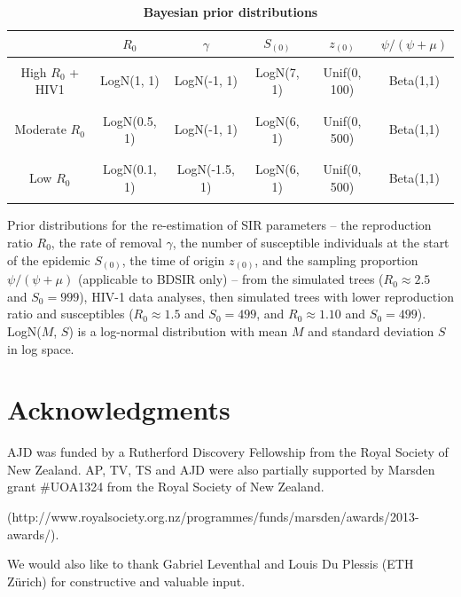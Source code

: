 \documentclass[12pt,titlepage]{article}
\newcommand{\BDSIR}{BDSIR}
\begin{document}
\begin{table}[!ht]
\begin{center}
\caption{
\bf{Bayesian prior distributions}}
\label{table:priors}
\begin{tabular}{|c|c|c|c|c|c|}
\hline
& $R_0$ & $\gamma$ & $S_{(0)}$ & $z_{(0)}$ & $\psi/(\psi+\mu)$ \\
  \hline
   & & & & & \\
High $R_{0}$ + HIV1 & LogN(1, 1) & LogN(-1, 1) & LogN(7, 1) & Unif(0, 100) & Beta(1,1) \\
   & & & & & \\
   \hline
   & & & & & \\
Moderate $R_0$ & LogN(0.5, 1) & LogN(-1, 1) & LogN(6, 1) & Unif(0, 500) & Beta(1,1) \\
   & & & & & \\
   \hline
      & & & & & \\
Low $R_0$ & LogN(0.1, 1) & LogN(-1.5, 1) & LogN(6, 1) & Unif(0, 500) & Beta(1,1) \\
   & & & & & \\
   \hline
\end{tabular}
\end{center}
{Prior distributions for the re-estimation of SIR parameters -- the reproduction ratio 
$R_0$, the rate of removal $\gamma$, the number of susceptible individuals at the start of 
the epidemic $S_{(0)}$, the time of origin $z_{(0)}$, and the sampling proportion $\psi/(\psi+\mu)$ (applicable to \BDSIR{} only) -- from the simulated trees (${R_0}\approx2.5$ and ${S_0}=999$), 
HIV-1 data analyses, then simulated trees with lower reproduction ratio and susceptibles (${R_0}\approx1.5$ and ${S_0}=499$, 
and $R_{0}\approx1.10$ and $S_{0}=499$). 
LogN($M$, $S$) is a log-normal distribution with mean $M$ and 
standard deviation $S$ in log space.}
\end{table}
%
\section{Acknowledgments}
AJD was funded by a Rutherford Discovery Fellowship from the Royal Society of New Zealand. 
AP, TV, TS and AJD were also partially supported by Marsden grant \#UOA1324 from the Royal Society of New Zealand.

(http://www.royalsociety.org.nz/programmes/funds/marsden/awards/2013-awards/).  

We would also like to thank Gabriel Leventhal and Louis Du Plessis (ETH Z\"urich) for constructive and valuable input.
%


\end{document}
